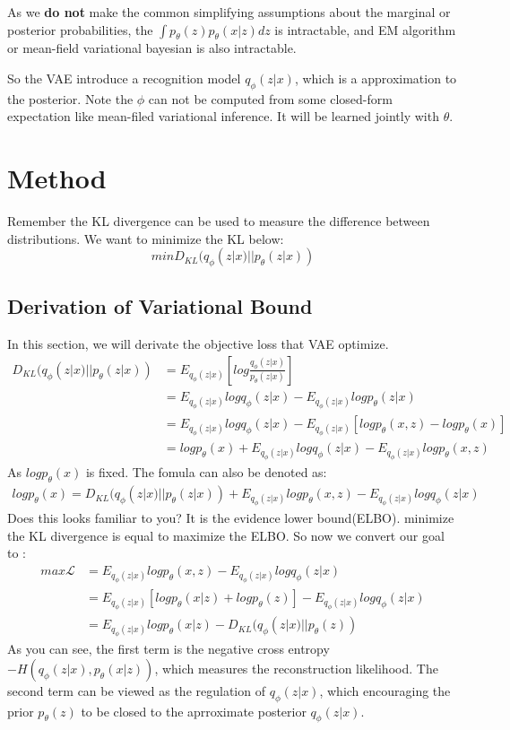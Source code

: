\documentclass{article}
\begin{document}
As we \textbf{do not} make the common simplifying assumptions about the marginal or posterior probabilities, the $\int p_{\theta}(z)p_{\theta}(x|z)dz$ is intractable, and EM algorithm or mean-field variational bayesian is also intractable.

So the VAE introduce a recognition model $q_{\phi}(z|x)$, which is a approximation to the posterior. Note the $\phi$ can not be computed from some closed-form expectation like mean-filed variational inference. It will be learned jointly with $\theta$.
\section{Method}
Remember the KL divergence can be used to measure the difference between distributions. We want to minimize the KL below:
$$min  D_{KL} (q_{\phi}(z|x)||p_{\theta}(z|x))$$
\subsection{Derivation of Variational Bound}
In this section, we will derivate the objective loss that VAE optimize.
\begin{align*}
D_{KL}(q_{\phi}(z|x)||p_{\theta}(z|x)) &= E_{q_{\phi}(z|x)} \left[ log \frac{q_{\phi}(z|x)}{p_{\theta}(z|x)} \right] \\
&= E_{q_{\phi}(z|x)}logq_{\phi}(z|x) -E_{q_{\phi}(z|x)} log p_{\theta}(z|x) \\
&= E_{q_{\phi}(z|x)}logq_{\phi}(z|x) -E_{q_{\phi}(z|x)}[log p_{\theta}(x,z)-log p_{\theta}(x)] \\
&= log p_{\theta}(x) + E_{q_{\phi}(z|x)}logq_{\phi}(z|x)- E_{q_{\phi}(z|x)}log p_{\theta}(x,z)
\end{align*}
As $log p_{\theta}(x)$ is fixed. The fomula can also be denoted as:
\begin{align*}
log p_{\theta}(x)=D_{KL}(q_{\phi}(z|x)||p_{\theta}(z|x)) + E_{q_{\phi}(z|x)}log p_{\theta}(x,z) -E_{q_{\phi}(z|x)}logq_{\phi}(z|x)
\end{align*}
Does this looks familiar to you? It is the evidence lower bound(ELBO). minimize the KL divergence is equal to maximize the ELBO. So now we convert our goal to :
\begin{align*}
max \mathcal{L} &= E_{q_{\phi}(z|x)}log p_{\theta}(x,z) -E_{q_{\phi}(z|x)}logq_{\phi}(z|x) \\
&= E_{q_{\phi}(z|x)}[logp_{\theta}(x|z)+logp_{\theta}(z)]-E_{q_{\phi}(z|x)}logq_{\phi}(z|x) \\
&= E_{q_{\phi}(z|x)}logp_{\theta}(x|z)-D_{KL}(q_{\phi}(z|x)||p_{\theta}(z))
\end{align*}
As you can see, the first term is the negative cross entropy $-H(q_{\phi}(z|x),p_{\theta}(x|z))$, which measures the reconstruction likelihood. The second term can be viewed as the regulation of $q_{\phi}(z|x)$, which encouraging the prior $p_{\theta}(z)$ to be closed to the aprroximate posterior $q_{\phi}(z|x)$.
\end{document}
